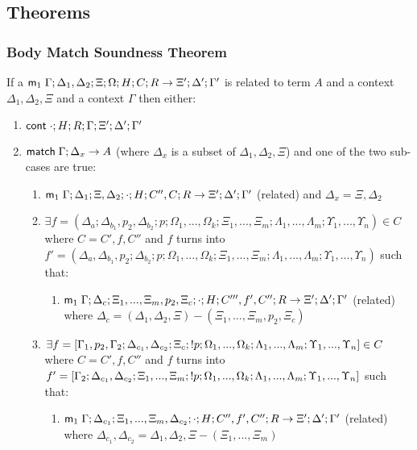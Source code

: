 \subsection{Theorems}

\subsubsection{Body Match Soundness Theorem}

\begin{theorem}

If a $\mathsf{m}_1 \; \Gamma; \Delta_1, \Delta_2; \Xi; \Omega; H; C; R \rightarrow \Xi'; \Delta'; \Gamma'$ is related to term $A$ and a context $\Delta_1, \Delta_2, \Xi$ and a context $\Gamma$ then either:

\begin{enumerate}
   \item $\mathsf{cont} \; \cdot; H; R; \Gamma; \Xi'; \Delta'; \Gamma'$
   \item $\mathsf{match} \; \Gamma; \Delta_x \rightarrow A$ (where $\Delta_x$ is a subset of $\Delta_1, \Delta_2, \Xi$) and one of the two sub-cases are true:
      \begin{enumerate}
         \item $\mathsf{m}_1 \; \Gamma; \Delta_1; \Xi, \Delta_2; \cdot; H; C'', C; R \rightarrow \Xi'; \Delta'; \Gamma'$ (related) and $\Delta_x = \Xi, \Delta_2$
         \item $\exists f = (\Delta_a; \Delta_{b_1}, p_2, \Delta_{b_2}; p; \Omega_1, ..., \Omega_k; \Xi_1, ..., \Xi_m; \Lambda_1, ..., \Lambda_m; \Upsilon_1, ..., \Upsilon_n) \in C$ where $C = C', f, C''$ and $f$ turns into $f' = (\Delta_a, \Delta_{b_1}, p_2; \Delta_{b_2}; p; \Omega_1, ..., \Omega_k; \Xi_1, ..., \Xi_m; \Lambda_1, ..., \Lambda_m; \Upsilon_1, ..., \Upsilon_n)$ such that:
         \begin{enumerate}
            \item $\mathsf{m}_1 \; \Gamma; \Delta_c; \Xi_1, ..., \Xi_m, p_2, \Xi_c; \cdot; H; C''', f', C''; R \rightarrow \Xi'; \Delta'; \Gamma'$ (related) where $\Delta_c = (\Delta_1, \Delta_2, \Xi) - (\Xi_1, ..., \Xi_m, p_2, \Xi_c)$
         \end{enumerate}
         \item $\exists f = [\Gamma_1, p_2, \Gamma_2; \Delta_{c_1}, \Delta_{c_2}; \Xi_c; {!} p; \Omega_1, ..., \Omega_k; \Lambda_1, ..., \Lambda_m; \Upsilon_1, ..., \Upsilon_n] \in C$ where $C = C', f, C''$ and $f$ turns into $f' = [\Gamma_2; \Delta_{c_1}, \Delta_{c_2}; \Xi_1, ..., \Xi_m; {!} p; \Omega_1, ..., \Omega_k; \Lambda_1, ..., \Lambda_m; \Upsilon_1, ..., \Upsilon_n]$ such that:
         \begin{enumerate}
            \item $\mathsf{m}_1 \; \Gamma; \Delta_{c_1}; \Xi_1, ..., \Xi_m, \Delta_{c_2}; \cdot; H; C'', f', C''; R \rightarrow \Xi'; \Delta'; \Gamma'$ (related) where $\Delta_{c_1}, \Delta_{c_2} = \Delta_1, \Delta_2, \Xi - (\Xi_1, ..., \Xi_m)$
         \end{enumerate}
      \end{enumerate}
\end{enumerate}


\end{theorem}
